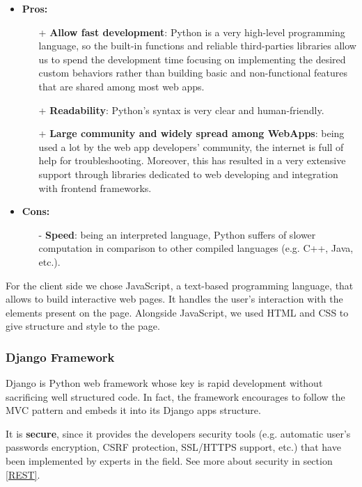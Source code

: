 \documentclass[table, 12pt]{article}
\begin{document}
\begin{itemize}
    \item \textbf{Pros:}
    \begin{itemize}
        \item[+] \textbf{Allow fast development}: Python is a very high-level programming language, so the built-in functions and reliable third-parties libraries allow us to spend the development time focusing on implementing the desired custom behaviors rather than building basic and non-functional features that are shared among most web apps.
        \item[+] \textbf{Readability}: Python's syntax is very clear and human-friendly.
        \item[+] \textbf{Large community and widely spread among WebApps}: being used a lot by the web app developers' community, the internet is full of help for troubleshooting. Moreover, this has resulted in a very extensive support through libraries dedicated to web developing and integration with frontend frameworks.
    \end{itemize}
    \item \textbf{Cons:}
    \begin{itemize}
        \item[-] \textbf{Speed}: being an interpreted language, Python suffers of slower computation in comparison to other compiled languages (e.g. C++, Java, etc.).
    \end{itemize}
\end{itemize}

For the client side we chose JavaScript, a text-based programming language, that allows to build interactive web pages. It handles the user's interaction with the elements present on the page.
Alongside JavaScript, we used HTML and CSS to give structure and style to the page.

\subsubsection{Django Framework}
Django is Python web framework whose key is rapid development without sacrificing well structured code. In fact, the framework encourages to follow the MVC pattern and embeds it into its Django apps structure.

It is \textbf{secure}, since it provides the developers security tools (e.g. automatic user's passwords encryption, CSRF protection, SSL/HTTPS support, etc.) that have been implemented by experts in the field. See more about security in section \ref{REST}.
\end{document}
